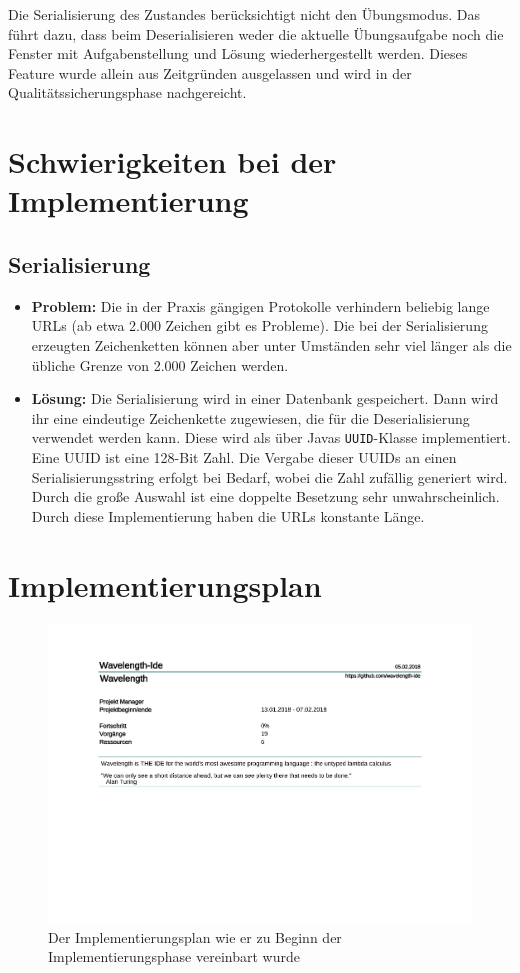 \documentclass[parskip=full,11pt]{scrartcl}
\begin{document}
Die Serialisierung des Zustandes berücksichtigt nicht den Übungsmodus. 
Das führt dazu, dass beim Deserialisieren weder die aktuelle Übungsaufgabe noch die Fenster mit Aufgabenstellung und Lösung wiederhergestellt werden.
Dieses Feature wurde allein aus Zeitgründen ausgelassen und wird in der Qualitätssicherungsphase nachgereicht.

\section{Schwierigkeiten bei der Implementierung}
\subsection{Serialisierung}
\begin{itemize}
\item[] \textbf{Problem:} 
Die in der Praxis gängigen Protokolle verhindern beliebig lange URLs (ab etwa 2.000 Zeichen gibt es Probleme). 
Die bei der Serialisierung erzeugten Zeichenketten können aber unter Umständen sehr viel länger als die übliche Grenze von 2.000 Zeichen werden.
\item[] \textbf{Lösung:} 
Die Serialisierung wird in einer Datenbank gespeichert. 
Dann wird ihr eine eindeutige Zeichenkette zugewiesen, die für die Deserialisierung verwendet werden kann.
Diese wird als über Javas \texttt{UUID}-Klasse implementiert.
Eine UUID ist eine 128-Bit Zahl.
Die Vergabe dieser UUIDs an einen Serialisierungsstring erfolgt bei Bedarf, wobei die Zahl zufällig generiert wird.
Durch die große Auswahl ist eine doppelte Besetzung sehr unwahrscheinlich.
Durch diese Implementierung haben die URLs konstante Länge.
\end{itemize}

\newpage
\section{Implementierungsplan}
\begin{figure}[h]
\hspace*{-2cm}
\includegraphics[trim={0, 9.5cm, 0, 0}, clip, scale=0.65, page=4]{Implementierungsplan/Implementierungsplan-vorher.pdf}
\caption{Der Implementierungsplan wie er zu Beginn der Implementierungsphase vereinbart wurde}
\end{figure}
\end{document}
